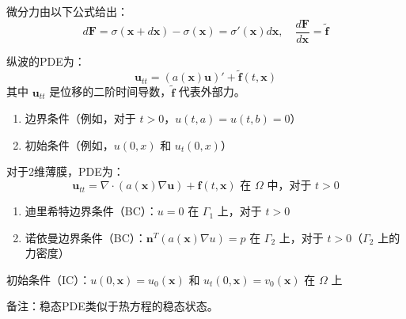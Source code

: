 \documentclass{ctexart}
\begin{document}
微分力由以下公式给出：
\[
d\mathbf{F} = \sigma (\mathbf{x} + d\mathbf{x}) - \sigma (\mathbf{x}) = \sigma'(\mathbf{x})d\mathbf{x}, \quad \frac{d\mathbf{F}}{d\mathbf{x}} = \tilde{\mathbf{f}}
\]

纵波的PDE为：
\[
\mathbf{u}_{tt} = (a(\mathbf{x})\mathbf{u})' + \tilde{\mathbf{f}}(t,\mathbf{x})
\]
其中 \( \mathbf{u}_{tt} \) 是位移的二阶时间导数，\( \tilde{\mathbf{f}} \) 代表外部力。

\begin{enumerate}
    \item 边界条件（例如，对于 \( t > 0 \)，\( u(t,a) = u(t,b) = 0 \)）
    \item 初始条件（例如，\( u(0,x) \) 和 \( u_t(0,x) \)）
\end{enumerate}

对于2维薄膜，PDE为：
\[
\mathbf{u}_{tt} = \nabla \cdot (a(\mathbf{x})\nabla \mathbf{u}) + \mathbf{f}(t,\mathbf{x}) \text{ 在 } \Omega \text{ 中，对于 } t > 0
\]

\begin{enumerate}
    \item 迪里希特边界条件（BC）：\( u = 0 \) 在 \( \Gamma_1 \) 上，对于 \( t > 0 \)
    \item 诺依曼边界条件（BC）：\( \mathbf{n}^T (a(\mathbf{x})\nabla u) = p \) 在 \( \Gamma_2 \) 上，对于 \( t > 0 \)（\( \Gamma_2 \) 上的力密度）
\end{enumerate}

初始条件（IC）：\( u(0,\mathbf{x}) = u_0(\mathbf{x}) \) 和 \( u_t(0,\mathbf{x}) = v_0(\mathbf{x}) \) 在 \( \Omega \) 上

备注：稳态PDE类似于热方程的稳态状态。
\end{document}
